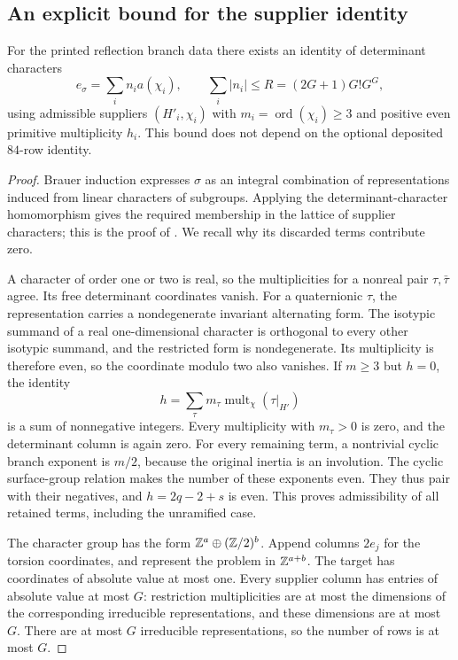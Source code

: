 \subsection{An explicit bound for the supplier identity}

\begin{proposition}\label{SQ3}
For the printed reflection branch data there exists an identity of determinant characters
\[
 e_\sigma=\sum_i n_i a(\chi_i),\qquad
 \sum_i|n_i|\le R=(2G+1)G!G^G,
\]
using admissible suppliers $(H'_i,\chi_i)$ with $m_i=\operatorname{ord}(\chi_i)\ge3$ and positive even primitive multiplicity $h_i$. This bound does not depend on the optional deposited $84$-row identity.
\end{proposition}
\begin{proof}
Brauer induction expresses $\sigma$ as an integral combination of representations induced from linear characters of subgroups. Applying the determinant-character homomorphism gives the required membership in the lattice of supplier characters; this is the proof of \citet[Section~5, Theorem \texttt{thm:brauer}]{Severn26}. We recall why its discarded terms contribute zero.

A character of order one or two is real, so the multiplicities for a nonreal pair $\tau,\bar\tau$ agree. Its free determinant coordinates vanish. For a quaternionic $\tau$, the representation carries a nondegenerate invariant alternating form. The isotypic summand of a real one-dimensional character is orthogonal to every other isotypic summand, and the restricted form is nondegenerate. Its multiplicity is therefore even, so the coordinate modulo two also vanishes. If $m\ge3$ but $h=0$, the identity
\[
 h=\sum_\tau m_\tau
       \operatorname{mult}_\chi(\tau|_{H'})
\]
is a sum of nonnegative integers. Every multiplicity with $m_\tau>0$ is zero, and the determinant column is again zero. For every remaining term, a nontrivial cyclic branch exponent is $m/2$, because the original inertia is an involution. The cyclic surface-group relation makes the number of these exponents even. They thus pair with their negatives, and $h=2q-2+s$ is even. This proves admissibility of all retained terms, including the unramified case.

The character group has the form $\mathbb Z^a\oplus(\mathbb Z/2)^b$. Append columns $2e_j$ for the torsion coordinates, and represent the problem in $\mathbb Z^{a+b}$. The target has coordinates of absolute value at most one. Every supplier column has entries of absolute value at most $G$: restriction multiplicities are at most the dimensions of the corresponding irreducible representations, and these dimensions are at most $G$. There are at most $G$ irreducible representations, so the number of rows is at most $G$.


\end{proof}
